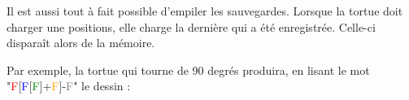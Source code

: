 \documentclass[a4paper,11pt,answers]{exam}
\begin{document}
	Il est aussi tout à fait possible d'empiler les sauvegardes. Lorsque la tortue doit charger une positions, elle charge la dernière qui a été enregistrée. Celle-ci disparaît alors de la mémoire.
	
	Par exemple, la tortue qui tourne de 90 degrés produira, en lisant le mot "\textcolor{red}{F}[\textcolor{blue}{F}[\textcolor{green}{F}]+\textcolor{orange}{F}]-\textcolor{gray}{F}" le dessin :
	\begin{center}
	\end{center}
\end{document}
